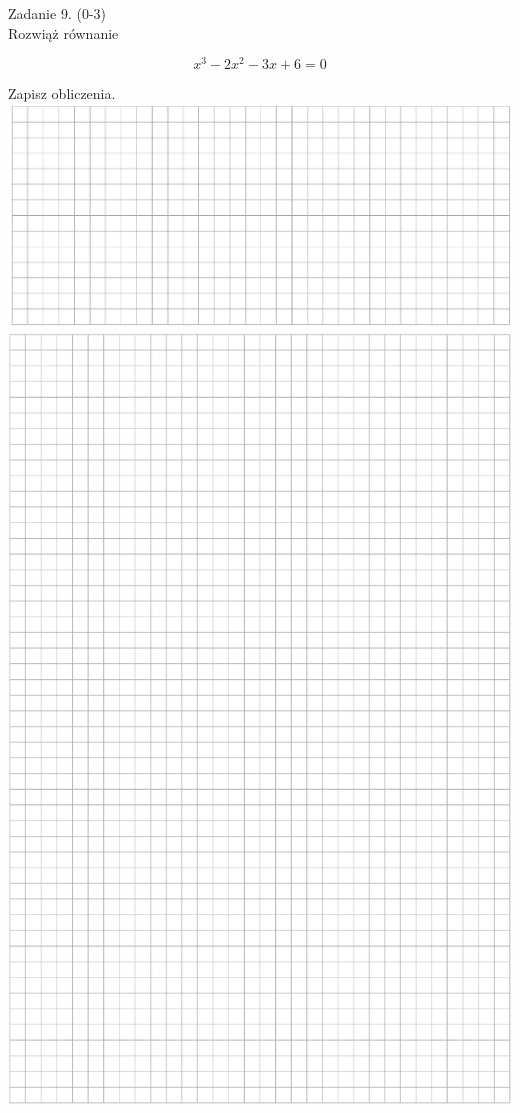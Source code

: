 \documentclass[10pt]{article}
\begin{document}
Zadanie 9. (0-3)\\
Rozwiąż równanie

\[
x^{3}-2 x^{2}-3 x+6=0
\]

Zapisz obliczenia.\\
\includegraphics[max width=\textwidth, center]{2024_11_21_daeb5e5efb43dd4cb535g-08}\\
\includegraphics[max width=\textwidth, center]{2024_11_21_daeb5e5efb43dd4cb535g-09}
\end{document}
